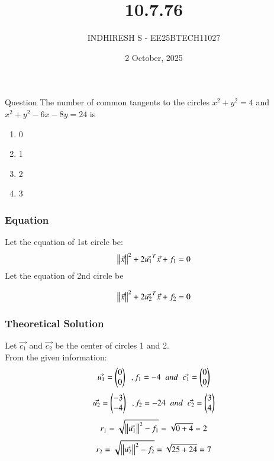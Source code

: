 \documentclass{beamer}
\title %
    {10.7.76}
\date{2 October, 2025}
\author %
    {INDHIRESH S - EE25BTECH11027}
\begin{document}
    
    \frame{\titlepage}
    
    \begin{frame}{Question}
   The number of common tangents to the circles $x^2 +y^2 = 4$ and $x^2 +y^2 -6x-8y = 24$ is
\begin{enumerate}
    \item 0
    \item 1
    \item 2
    \item 3
\end{enumerate}
    \end{frame}
    
    \begin{frame}[allowframebreaks] 
    \frametitle{Equation}
        \centering
        \label{tab:parameters}
  Let the equation of 1st circle be:
\begin{align}
 \left\lVert\Vec{x}\right\rVert^2+2\Vec{u_1}^T\Vec{x}+f_1=0
\end{align}
Let the equation of 2nd circle be 

\begin{align}
  \left\lVert\Vec{x}\right\rVert^2+2\Vec{u_2}^T\Vec{x}+f_2=0
\end{align}

    \end{frame}
    
    \begin{frame}
    \frametitle{Theoretical Solution}
    Let $\Vec{c_1}$ and $\Vec{c_2}$ be the center of circles 1 and 2.\\
From the given information:
\begin{align}
\Vec{u_1}=\begin{pmatrix}0\\0\end{pmatrix}\;\;,f_1=-4\;\;and\;\;\Vec{c_1}=\begin{pmatrix}0\\0\end{pmatrix}
\end{align}
\begin{align}
\Vec{u_2}=\begin{pmatrix}-3\\-4\end{pmatrix}\;\;,f_2=-24\;\;and\;\;\Vec{c_2}=\begin{pmatrix}3\\4\end{pmatrix}
\end{align}
    \begin{align}
 r_1=\sqrt{\left\lVert\Vec{u_1}\right\rVert^2-f_1}=\sqrt{0+4}=2
\end{align}
\begin{align}
    r_2=\sqrt{\left\lVert\Vec{u_2}\right\rVert^2-f_2}=\sqrt{25+24}=7
\end{align}


    \end{frame}
    
\end{document}
